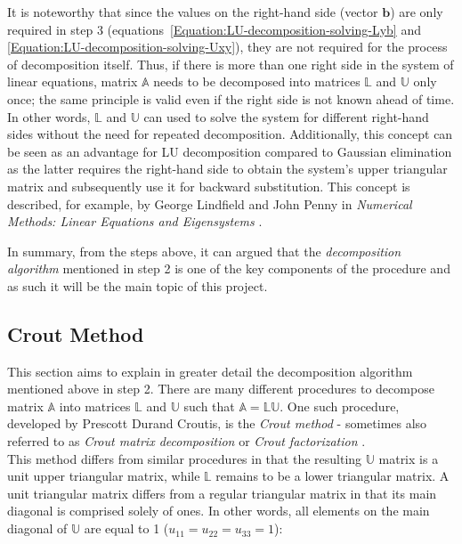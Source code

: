 It is noteworthy that since the values on the right-hand side (vector $ \textbf{b} $) are only required in step 3 (equations~\ref{Equation:LU-decomposition-solving-Lyb} and \ref{Equation:LU-decomposition-solving-Uxy}), they are not required for the process of decomposition itself. Thus, if there is more than one right side in the system of linear equations, matrix $ \mathbb{A} $ needs to be decomposed into matrices $ \mathbb{L} $ and $ \mathbb{U} $ only once; the same principle is valid even if the right side is not known ahead of time. In other words, $ \mathbb{L} $ and $ \mathbb{U} $ can used to solve the system for different right-hand sides without the need for repeated decomposition. Additionally, this concept can be seen as an advantage for LU decomposition compared to Gaussian elimination as the latter requires the right-hand side to obtain the system's upper triangular matrix and subsequently use it for backward substitution. This concept is described, for example, by George Lindfield and John Penny in \emph{Numerical Methods: Linear Equations and Eigensystems} \cite{Lindfield2019}.

In summary, from the steps above, it can argued that the \textit{decomposition algorithm} mentioned in step 2 is one of the key components of the procedure and as such it will be the main topic of this project.

\subsection{Crout Method}\label{Subsection:LU-decomposition-crout-method}
This section aims to explain in greater detail the decomposition algorithm mentioned above in step 2. There are many different procedures to decompose matrix $ \mathbb{A} $ into matrices $ \mathbb{L} $ and $ \mathbb{U} $ such that $ \mathbb{A} = \mathbb{LU} $. One such procedure, developed by Prescott Durand Croutis, is the \textit{Crout method} - sometimes also referred to as \textit{Crout matrix decomposition} or \textit{Crout factorization} \cite{Press2007}. \\
This method differs from similar procedures in that the resulting $ \mathbb{U} $ matrix is a unit upper triangular matrix, while $ \mathbb{L} $ remains to be a lower triangular matrix. A unit triangular matrix differs from a regular triangular matrix in that its main diagonal is comprised solely of ones. In other words, all elements on the main diagonal of $ \mathbb{U} $ are equal to 1 ($ u_{11} = u_{22} = u_{33} = 1 $):

